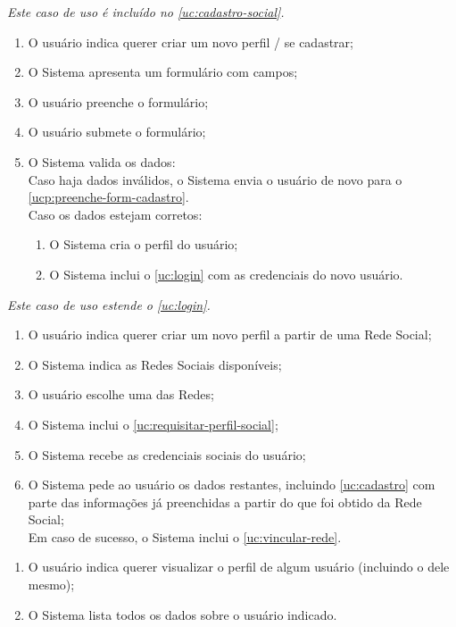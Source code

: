 \documentclass[12pt,a4paper,twoside,hyphens,english,brazil]{abntex2}
\begin{document}
{
\emph{Este caso de uso é incluído no \ref{uc:cadastro-social}.}
\begin{enumerate}[itemsep=-1ex,topsep=-1ex]
	\item O usuário indica querer criar um novo perfil / se cadastrar;
	\item O Sistema apresenta um formulário com campos; \label{ucp:preenche-form-cadastro}
	\item O usuário preenche o formulário;
	\item O usuário submete o formulário;
	\item O Sistema valida os dados:
		\\Caso haja dados inválidos, o Sistema envia o usuário de novo para o \autoref{ucp:preenche-form-cadastro}.
		\\Caso os dados estejam corretos:
			\begin{enumerate}[itemsep=-1ex,topsep=-1ex]
				\item O Sistema cria o perfil do usuário;
				\item O Sistema inclui o \ref{uc:login} com as credenciais do novo usuário.
			\end{enumerate}
\end{enumerate}

\emph{Este caso de uso estende o \ref{uc:login}.}
\begin{enumerate}[itemsep=-1ex,topsep=-1ex]
	\item O usuário indica querer criar um novo perfil a partir de uma Rede Social;
	\item O Sistema indica as Redes Sociais disponíveis;
	\item O usuário escolhe uma das Redes;
	\item O Sistema inclui o \ref{uc:requisitar-perfil-social};
	\item O Sistema recebe as credenciais sociais do usuário;
	\item O Sistema pede ao usuário os dados restantes, incluindo \ref{uc:cadastro} com parte das informações já preenchidas a partir do que foi obtido da Rede Social;
		\\Em caso de sucesso, o Sistema inclui o \ref{uc:vincular-rede}.
\end{enumerate}

\begin{enumerate}[itemsep=-1ex]
	\item O usuário indica querer visualizar o perfil de algum usuário (incluindo o dele mesmo);
	\item O Sistema lista todos os dados sobre o usuário indicado.
\end{enumerate}

}
\end{document}
